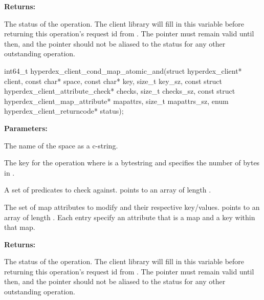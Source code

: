 \noindent\textbf{Returns:}
\begin{description}[labelindent=\widthof{{\code{status}}},leftmargin=*,noitemsep,nolistsep,align=right]
\item[\code{status}] The status of the operation.  The client library will fill in this variable before returning this operation's request id from .  The pointer must remain valid until then, and the pointer should not be aliased to the status for any other outstanding operation.
\end{description}

\funcsep
{}
\begin{ccode}
int64_t hyperdex_client_cond_map_atomic_and(struct hyperdex_client* client,
                const char* space,
                const char* key, size_t key_sz,
                const struct hyperdex_client_attribute_check* checks, size_t checks_sz,
                const struct hyperdex_client_map_attribute* mapattrs, size_t mapattrs_sz,
                enum hyperdex_client_returncode* status);
\end{ccode}
\funcdesc 

\noindent\textbf{Parameters:}
\begin{description}[labelindent=\widthof{{\code{mapattrs}, \code{mapattrs\_sz}}},leftmargin=*,noitemsep,nolistsep,align=right]
\item[\code{space}] The name of the space as a c-string.
\item[\code{key}, \code{key\_sz}] The key for the operation where  is a bytestring and  specifies the number of bytes in .
\item[\code{checks}, \code{checks\_sz}] A set of predicates to check against.   points to an array of length .
\item[\code{mapattrs}, \code{mapattrs\_sz}] The set of map attributes to modify and their respective key/values.   points to an array of length .  Each entry specify an attribute that is a map and a key within that map.
\end{description}

\noindent\textbf{Returns:}
\begin{description}[labelindent=\widthof{{\code{status}}},leftmargin=*,noitemsep,nolistsep,align=right]
\item[\code{status}] The status of the operation.  The client library will fill in this variable before returning this operation's request id from .  The pointer must remain valid until then, and the pointer should not be aliased to the status for any other outstanding operation.
\end{description}


